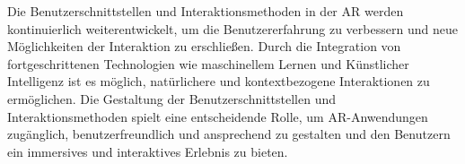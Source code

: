 Die Benutzerschnittstellen und Interaktionsmethoden in der AR werden
kontinuierlich weiterentwickelt, um die Benutzererfahrung zu verbessern und
neue Möglichkeiten der Interaktion zu erschließen. Durch die Integration von
fortgeschrittenen Technologien wie maschinellem Lernen und Künstlicher
Intelligenz ist es möglich, natürlichere und kontextbezogene Interaktionen zu
ermöglichen. Die Gestaltung der Benutzerschnittstellen und Interaktionsmethoden
spielt eine entscheidende Rolle, um AR-Anwendungen zugänglich,
benutzerfreundlich und ansprechend zu gestalten und den Benutzern ein
immersives und interaktives Erlebnis zu bieten. \cite{billinghurst2015survey}\\